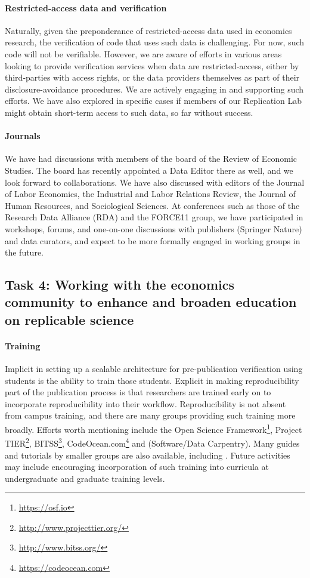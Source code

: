 \documentclass[AEJ]{AEA}
\newcommand{\urlcite}[2]{#2\footnote{\url{#1}}}
\begin{document}
\paragraph{Restricted-access data and verification} Naturally, given the preponderance of restricted-access data used in economics research, the verification of code that uses such data is challenging. For now, such code will not be verifiable. However, we are aware of efforts in various areas looking to provide verification services when data are restricted-access, either by third-parties with access rights, or the data providers themselves as part of their disclosure-avoidance procedures. We  are actively engaging in and supporting such efforts. We have also explored in specific cases if members of our Replication Lab might  obtain short-term access to such data, so far without success.

\paragraph{Journals} We have had discussions with members of the board of the Review of Economic Studies. The board has recently appointed a Data Editor there as well, and we look forward to collaborations. We have also discussed with editors of the Journal of Labor Economics, the Industrial and Labor Relations Review, the Journal of Human Resources, and Sociological Sciences. At conferences such as those of the Research Data Alliance (RDA) and the FORCE11 group, we have participated in workshops, forums, and one-on-one discussions with publishers (Springer Nature) and data curators, and expect to be more formally engaged in working groups in the future. 

\subsection{Task 4: Working with the economics community to enhance and broaden education on replicable science}

\paragraph{Training}

Implicit in setting up a scalable architecture for pre-publication verification using students is the ability to train those students. Explicit in making reproducibility part of the publication process is that researchers are trained early on to incorporate reproducibility into their workflow. Reproducibility is not absent from campus training, and there are many groups providing such training more broadly. Efforts worth mentioning include the  \urlcite{https://osf.io}{Open Science Framework}, \urlcite{http://www.projecttier.org/}{Project TIER}, \urlcite{http://www.bitss.org/}{BITSS}, \urlcite{https://codeocean.com}{CodeOcean.com} and (Software/Data Carpentry). Many guides and tutorials by smaller groups are also available, including \cite{Gentzkow2014,Wilson2016-bt,Vilhuber2018}. Future activities may include encouraging incorporation of such training into curricula at undergraduate and graduate training levels. 
\end{document}
